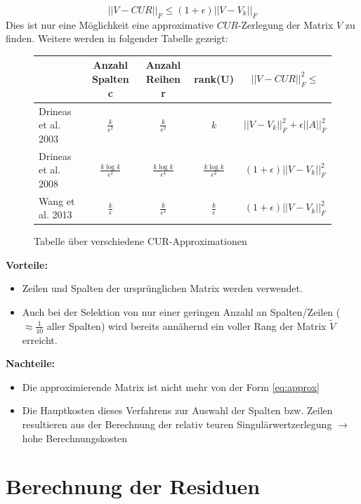\documentclass[12pt,a4paper,twoside]{article}
\begin{document}
		\begin{equation*}
			||V-CUR||_F\leq (1+\epsilon)||V-V_k||_F
		\end{equation*}
		Dies ist nur eine Möglichkeit eine approximative $CUR$-Zerlegung der Matrix $V$ zu finden. Weitere werden in 
		folgender Tabelle gezeigt: \newline
		\begin{figure}[h]
			\begin{tabular}{l||c|c|c|c}
		 		& Anzahl Spalten c & Anzahl Reihen r & rank(U) & $||V-CUR||_F^2\leq$ \\
		 		\hline \hline
		 		Drineas et al. 2003 \citep{drineas2003} & $\frac{k}{\epsilon^2}$ & $\frac{k}{\epsilon^2}$ & $k$ & $||V-V_k||_F^2+\epsilon||A||^2_F$ \\
		 		\hline
		 		Drineas et al. 2008 \citep{Drineas2009} & $\frac{k\log k}{\epsilon^2}$ & $\frac{k\log k}{\epsilon^4}$ & $\frac{k\log k}{\epsilon^2}$ & $(1+\epsilon)||V-V_k||^2_F$ \\
		 		\hline
		 		Wang et al. 2013 \citep{Wang2013}& $\frac{k}{\epsilon}$ & $\frac{k}{\epsilon^2}$ & $\frac{k}{\epsilon}$ & $(1+\epsilon)||V-V_k||^2_F$
			\end{tabular}
			\caption{Tabelle über verschiedene CUR-Approximationen}
		\end{figure}
		
		\textbf{Vorteile:}
		\begin{itemize}
			\item Zeilen und Spalten der ursprünglichen Matrix werden verwendet.
			\item Auch bei der Selektion von nur einer geringen Anzahl an Spalten/Zeilen ($\approx\frac{1}{10}$ aller Spalten) wird bereits annähernd ein voller Rang der Matrix $\tilde{V}$ erreicht.
		\end{itemize}
		\newpage
		\textbf{Nachteile:} 
		\begin{itemize}
			\item Die approximierende Matrix ist nicht mehr von der Form \ref{eq:approx}
			\item Die Hauptkosten dieses Verfahrens zur Auswahl der Spalten bzw. Zeilen resultieren aus der Berechnung der relativ teuren Singulärwertzerlegung $\rightarrow$ hohe Berechnungskosten
		\end{itemize}
		\newpage
\section{Berechnung der Residuen}
\end{document}
